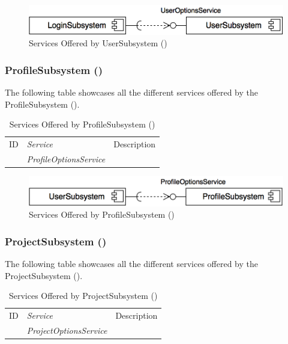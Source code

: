 \documentclass[12pt,letterpaper]{article}
\begin{document}
\begin{figure}[H]
	\centering{}
	\includegraphics[scale=0.40]{imgs/d3/services/user-subsystem.png}
	\caption{Services Offered by UserSubsystem ()}
\end{figure}

\subsubsection{ProfileSubsystem ()}

\noindent{}
The following table showcases all the different services offered by the ProfileSubsystem ().

\begin{table}[H]
	\caption{Services Offered by ProfileSubsystem ()} 
	\begin{tabu} to 
		\tableheader{}ID & Service & Description\\
		 & ProfileOptionsService & \\
	\end{tabu}
\end{table}

\begin{figure}[H]
	\centering{}
	\includegraphics[scale=0.40]{imgs/d3/services/profile-subsystem.png}
	\caption{Services Offered by ProfileSubsystem ()}
\end{figure}

\subsubsection{ProjectSubsystem ()}

\noindent{}
The following table showcases all the different services offered by the ProjectSubsystem ().

\begin{table}[H]
	\caption{Services Offered by ProjectSubsystem ()} 
	\begin{tabu} to 
		\tableheader{}ID & Service & Description\\
		 & ProjectOptionsService & \\
	\end{tabu}
\end{table}
\end{document}
